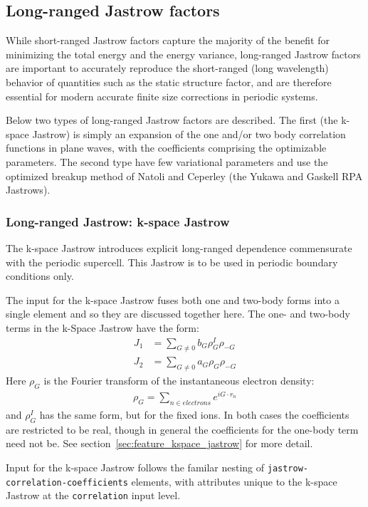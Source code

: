 

\subsection{Long-ranged Jastrow factors}
While short-ranged Jastrow factors capture the majority of the benefit 
for minimizing the total energy and the energy variance, long-ranged 
Jastrow factors are important to accurately reproduce the short-ranged 
(long wavelength) behavior of quantities such as the static structure 
factor, and are therefore essential for modern accurate finite size 
corrections in periodic systems.

Below two types of long-ranged Jastrow factors are described.  The 
first (the k-space Jastrow) is simply an expansion of the one and/or 
two body correlation functions in plane waves, with the coefficients 
comprising the optimizable parameters.  The second type have few 
variational parameters and use the optimized breakup method of Natoli 
and Ceperley\cite{Natoli1995} (the Yukawa and Gaskell RPA Jastrows).


\subsubsection{Long-ranged Jastrow: k-space Jastrow}
The k-space Jastrow introduces explicit long-ranged dependence commensurate with the periodic supercell.  This Jastrow is to be used in periodic boundary conditions only.  

The input for the k-space Jastrow fuses both one and two-body forms into a single element and so they are discussed together here.  The one- and two-body terms in the k-Space Jastrow have the form:
\begin{align}
  J_1 &= \sum_{G\ne 0}b_G\rho_G^I\rho_{-G} \\
  J_2 &= \sum_{G\ne 0}a_G\rho_G\rho_{-G}
\end{align}
Here $\rho_G$ is the Fourier transform of the instantaneous electron density:
\begin{align}
  \rho_G=\sum_{n\in electrons}e^{iG\cdot r_n}
\end{align}
and $\rho_G^I$ has the same form, but for the fixed ions. In both cases the coefficients are restricted to be real, though in general the coefficients for the one-body term need not be.  See section~\ref{sec:feature_kspace_jastrow} for more detail.

Input for the k-space Jastrow follows the familar nesting of \texttt{jastrow-correlation-coefficients} elements, with attributes unique to the k-space Jastrow at the \texttt{correlation} input level.

